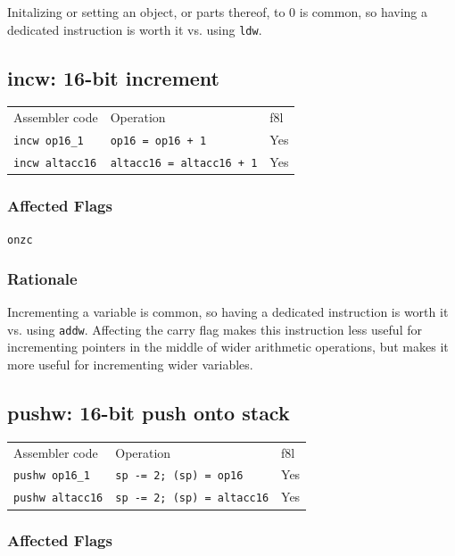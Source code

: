 \documentclass{book}
\begin{document}
Initalizing or setting an object, or parts thereof, to 0 is common, so having a dedicated instruction is worth it vs. using \texttt{ldw}.


\subsection{incw: 16-bit increment}

\begin{tabular}{l l l}
Assembler code         & Operation                        & f8l \\
\texttt{incw op16\_1}  & \texttt{op16 = op16 + 1}         & Yes \\
\texttt{incw altacc16} & \texttt{altacc16 = altacc16 + 1} & Yes
\end{tabular}

\subsubsection*{Affected Flags}

\texttt{onzc}

\subsubsection*{Rationale}

Incrementing a variable is common, so having a dedicated instruction is worth it vs. using \texttt{addw}. Affecting the carry flag makes this instruction less useful for incrementing pointers in the middle of wider arithmetic operations, but makes it more useful for incrementing wider variables.


\subsection{pushw: 16-bit push onto stack}

\begin{tabular}{l l l}
Assembler code          & Operation                         & f8l \\
\texttt{pushw op16\_1}  & \texttt{sp -= 2; (sp) = op16}     & Yes \\
\texttt{pushw altacc16} & \texttt{sp -= 2; (sp) = altacc16} & Yes
\end{tabular}

\subsubsection*{Affected Flags}
\end{document}
